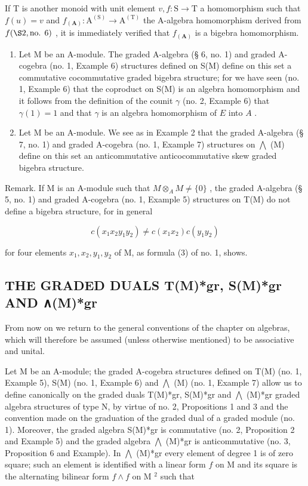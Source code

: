 If T is another monoid with unit element \(v, f: \mathrm{S} \to \mathrm{T}\) a homomorphism such that \(f(u) = v\) and \(f_{(\mathbf{A})}: \mathrm{A}^{(\mathrm{S})} \to \mathrm{A}^{(\mathrm{T})}\) the A-algebra homomorphism derived from \(f(\S 2, \text{no. } 6)\) , it is immediately verified that \(f_{(\mathbf{A})}\) is a bigebra homomorphism.

\begin{enumerate}
\def\labelenumi{(\arabic{enumi})}
\setcounter{enumi}{1}
\item
  Let M be an A-module. The graded A-algebra (§ 6, no. 1) and graded A-cogebra (no. 1, Example 6) structures defined on S(M) define on this set a commutative cocommutative graded bigebra structure; for we have seen (no. 1, Example 6) that the coproduct on S(M) is an algebra homomorphism and it follows from the definition of the counit \(\gamma\) (no. 2, Example 6) that \(\gamma(1) = 1\) and that \(\gamma\) is an algebra homomorphism of \(E\) into \(A\) .
\item
  Let M be an A-module. We see as in Example 2 that the graded A-algebra (§ 7, no. 1) and graded A-cogebra (no. 1, Example 7) structures on \(\bigwedge\) (M) define on this set an anticommutative anticocommutative skew graded bigebra structure.
\end{enumerate}

Remark. If M is an A-module such that \(M \otimes_{A} M \neq \{0\}\) , the graded A-algebra (§ 5, no. 1) and graded A-cogebra (no. 1, Example 5) structures on T(M) do not define a bigebra structure, for in general

\[
c (x _ {1} x _ {2} y _ {1} y _ {2}) \neq c (x _ {1} x _ {2}) c (y _ {1} y _ {2})
\]

for four elements \(x_{1}, x_{2}, y_{1}, y_{2}\) of M, as formula (3) of no. 1, shows.

\subsection{THE GRADED DUALS T(M)*gr, S(M)*gr AND ∧(M)*gr}

From now on we return to the general conventions of the chapter on algebras, which will therefore be assumed (unless otherwise mentioned) to be associative and unital.

Let M be an A-module; the graded A-cogebra structures defined on T(M) (no. 1, Example 5), S(M) (no. 1, Example 6) and \(\bigwedge\) (M) (no. 1, Example 7) allow us to define canonically on the graded duals T(M)*gr, S(M)*gr and \(\bigwedge\) (M)*gr graded algebra structures of type N, by virtue of no. 2, Propositions 1 and 3 and the convention made on the graduation of the graded dual of a graded module (no. 1). Moreover, the graded algebra S(M)*gr is commutative (no. 2, Proposition 2 and Example 5) and the graded algebra \(\bigwedge\) (M)*gr is anticommutative (no. 3, Proposition 6 and Example). In \(\bigwedge\) (M)*gr every element of degree 1 is of zero square; such an element is identified with a linear form \(f\) on M and its square is the alternating bilinear form \(f \wedge f\) on M \(^{2}\) such that

